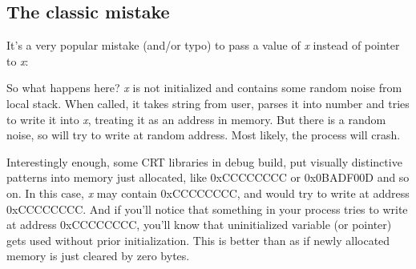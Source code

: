\subsection{The classic mistake}

It's a very popular mistake (and/or typo) to pass a value of \emph{x} instead of pointer to \emph{x}:



So what happens here?
\emph{x} is not initialized and contains some random noise from local stack.
When \scanf called, it takes string from user, parses it into number and tries to write it into \emph{x}, treating
it as an address in memory.
But there is a random noise, so \scanf will try to write at random address.
Most likely, the process will crash.

Interestingly enough, some \ac{CRT} libraries in debug build, put visually distinctive patterns
into memory just allocated, like 0xCCCCCCCC or 0x0BADF00D and so on.
In this case, \emph{x} may contain 0xCCCCCCCC, and \scanf would try to write at address 0xCCCCCCCC.
And if you'll notice that something in your process tries to write at address 0xCCCCCCCC, you'll know
that uninitialized variable (or pointer) gets used without prior initialization.
This is better than as if newly allocated memory is just cleared by zero bytes.

